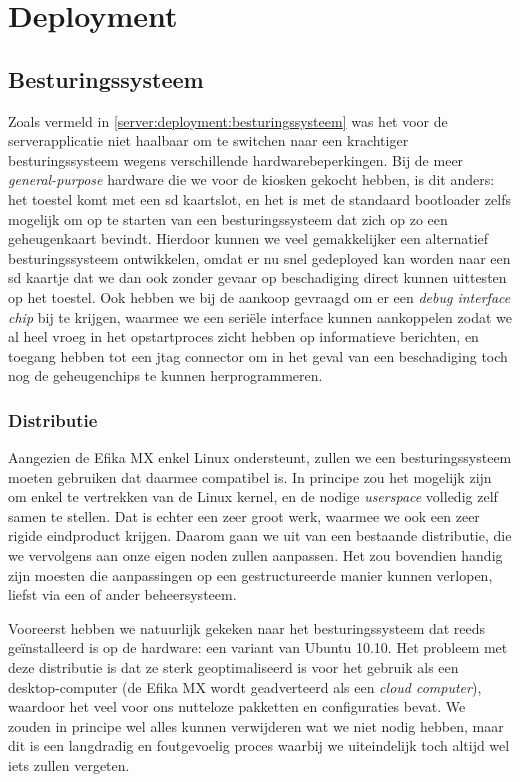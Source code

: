 \chapter{Deployment}
\label{kiosk:deployment}

\section{Besturingssysteem}
\label{kiosk:deployment:besturingssysteem}

Zoals vermeld in \ref{server:deployment:besturingssysteem} was het voor de serverapplicatie niet haalbaar om te switchen naar een krachtiger besturingssysteem wegens verschillende hardwarebeperkingen. Bij de meer \emph{general-purpose} hardware die we voor de kiosken gekocht hebben, is dit anders: het toestel komt met een \ac{sd} kaartslot, en het is met de standaard bootloader zelfs mogelijk om op te starten van een besturingssysteem dat zich op zo een geheugenkaart bevindt. Hierdoor kunnen we veel gemakkelijker een alternatief besturingssysteem ontwikkelen, omdat er nu snel gedeployed kan worden naar een \ac{sd} kaartje dat we dan ook zonder gevaar op beschadiging direct kunnen uittesten op het toestel. Ook hebben we bij de aankoop gevraagd om er een \emph{debug interface chip} bij te krijgen, waarmee we een seriële interface kunnen aankoppelen zodat we al heel vroeg in het opstartproces zicht hebben op informatieve berichten, en toegang hebben tot een \ac{jtag} connector om in het geval van een beschadiging toch nog de geheugenchips te kunnen herprogrammeren.

\subsection{Distributie}
\label{kiosk:deployment:besturingssysteem:distributie}

Aangezien de Efika MX enkel Linux ondersteunt, zullen we een besturingssysteem moeten gebruiken dat daarmee compatibel is. In principe zou het mogelijk zijn om enkel te vertrekken van de Linux kernel, en de nodige \emph{userspace} volledig zelf samen te stellen. Dat is echter een zeer groot werk, waarmee we ook een zeer rigide eindproduct krijgen. Daarom gaan we uit van een bestaande distributie, die we vervolgens aan onze eigen noden zullen aanpassen. Het zou bovendien handig zijn moesten die aanpassingen op een gestructureerde manier kunnen verlopen, liefst via een of ander beheersysteem.

Vooreerst hebben we natuurlijk gekeken naar het besturingssysteem dat reeds geïnstalleerd is op de hardware: een variant van Ubuntu 10.10. Het probleem met deze distributie is dat ze sterk geoptimaliseerd is voor het gebruik als een desktop-computer (de Efika MX wordt geadverteerd als een \emph{cloud computer}), waardoor het veel voor ons nutteloze pakketten en configuraties bevat. We zouden in principe wel alles kunnen verwijderen wat we niet nodig hebben, maar dit is een langdradig en foutgevoelig proces waarbij we uiteindelijk toch altijd wel iets zullen vergeten.

